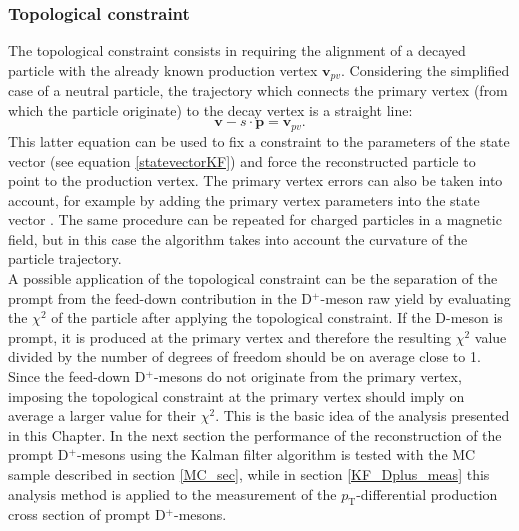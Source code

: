 \documentclass[b5paper,10pt,twoside,oldstyle,classica]{toptesi}
\newcommand{\pt}{p_\text{T}}
\begin{document}
\subsubsection{Topological constraint}
The topological constraint consists in requiring the alignment of a decayed particle with the already known production vertex $\pmb{v}_{pv}$. Considering the simplified case of a neutral particle, the trajectory which connects the primary vertex (from which the particle originate) to the decay vertex is a straight line:
\begin{equation}
 \pmb{v}-s\cdot\pmb{p} = \pmb{v}_{pv}.
\end{equation}
This latter equation can be used to fix a constraint to the parameters of the state vector (see equation \ref{statevectorKF}) and force the reconstructed particle to point to the production vertex. The primary vertex errors can also be taken into account, for example by adding the primary vertex parameters into the state vector \cite{Kisel:2006}. The same procedure can be repeated for charged particles in a magnetic field, but in this case the algorithm takes into account the curvature of the particle trajectory. \\
A possible application of the topological constraint can be the separation of the prompt from the feed-down contribution in the D$^+$-meson raw yield by evaluating the $\chi^2$ of the particle after applying the topological constraint. If the D-meson is prompt, it is produced at the primary vertex and therefore the resulting $\chi^2$ value divided by the number of degrees of freedom should be on average close to 1. Since the feed-down D$^+$-mesons do not originate from the primary vertex, imposing the topological constraint at the primary vertex should imply on average a larger value for their $\chi^2$. This is the basic idea of the analysis presented in this Chapter. In the next section the performance of the reconstruction of the prompt D$^+$-mesons using the Kalman filter algorithm is tested with the MC sample described in section \ref{MC_sec}, while in section \ref{KF_Dplus_meas} this analysis method is applied to the measurement of the $\pt$-differential production cross section of prompt D$^+$-mesons. 
\end{document}
